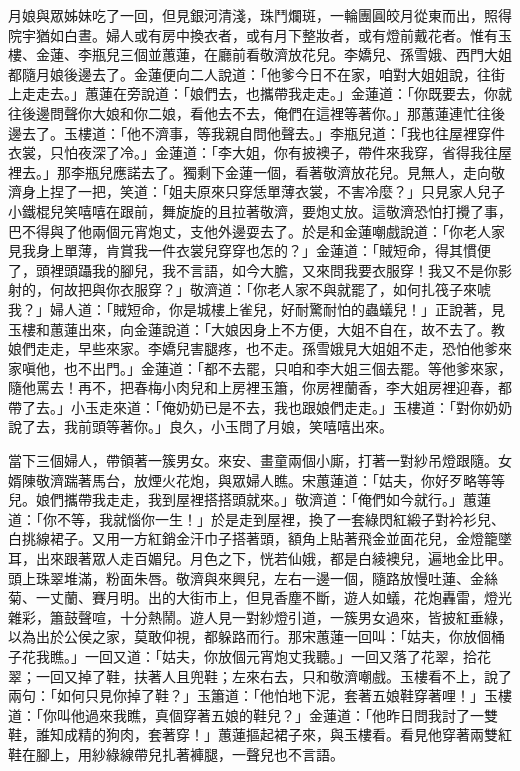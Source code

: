 月娘與眾姊妹吃了一回，但見銀河清淺，珠鬥爛斑，一輪團圓皎月從東而出，照得院宇猶如白晝。婦人或有房中換衣者，或有月下整妝者，或有燈前戴花者。惟有玉樓、金蓮、李瓶兒三個並蕙蓮，在廳前看敬濟放花兒。李嬌兒、孫雪娥、西門大姐都隨月娘後邊去了。金蓮便向二人說道：「他爹今日不在家，咱對大姐姐說，往街上走走去。」蕙蓮在旁說道：「娘們去，也攜帶我走走。」金蓮道：「你既要去，你就往後邊問聲你大娘和你二娘，看他去不去，俺們在這裡等著你。」那蕙蓮連忙往後邊去了。玉樓道：「他不濟事，等我親自問他聲去。」李瓶兒道：「我也往屋裡穿件衣裳，只怕夜深了冷。」金蓮道：「李大姐，你有披襖子，帶件來我穿，省得我往屋裡去。」那李瓶兒應諾去了。獨剩下金蓮一個，看著敬濟放花兒。見無人，走向敬濟身上捏了一把，笑道：「姐夫原來只穿恁單薄衣裳，不害冷麼？」只見家人兒子小鐵棍兒笑嘻嘻在跟前，舞旋旋的且拉著敬濟，要炮丈放。這敬濟恐怕打攪了事，巴不得與了他兩個元宵炮丈，支他外邊耍去了。於是和金蓮嘲戲說道：「你老人家見我身上單薄，肯賞我一件衣裳兒穿穿也怎的？」金蓮道：「賊短命，得其慣便了，頭裡頭躡我的腳兒，我不言語，如今大膽，又來問我要衣服穿！我又不是你影射的，何故把與你衣服穿？」敬濟道：「你老人家不與就罷了，如何扎筏子來唬我？」婦人道：「賊短命，你是城樓上雀兒，好耐驚耐怕的蟲蟻兒！」正說著，見玉樓和蕙蓮出來，向金蓮說道：「大娘因身上不方便，大姐不自在，故不去了。教娘們走走，早些來家。李嬌兒害腿疼，也不走。孫雪娥見大姐姐不走，恐怕他爹來家嗔他，也不出門。」金蓮道：「都不去罷，只咱和李大姐三個去罷。等他爹來家，隨他罵去！再不，把春梅小肉兒和上房裡玉簫，你房裡蘭香，李大姐房裡迎春，都帶了去。」小玉走來道：「俺奶奶已是不去，我也跟娘們走走。」玉樓道：「對你奶奶說了去，我前頭等著你。」良久，小玉問了月娘，笑嘻嘻出來。

當下三個婦人，帶領著一簇男女。來安、畫童兩個小廝，打著一對紗吊燈跟隨。女婿陳敬濟踹著馬台，放煙火花炮，與眾婦人瞧。宋蕙蓮道：「姑夫，你好歹略等等兒。娘們攜帶我走走，我到屋裡搭搭頭就來。」敬濟道：「俺們如今就行。」蕙蓮道：「你不等，我就惱你一生！」於是走到屋裡，換了一套綠閃紅緞子對衿衫兒、白挑線裙子。又用一方紅銷金汗巾子搭著頭，額角上貼著飛金並面花兒，金燈籠墜耳，出來跟著眾人走百媚兒。月色之下，恍若仙娥，都是白綾襖兒，遍地金比甲。頭上珠翠堆滿，粉面朱唇。敬濟與來興兒，左右一邊一個，隨路放慢吐蓮、金絲菊、一丈蘭、賽月明。出的大街市上，但見香塵不斷，遊人如蟻，花炮轟雷，燈光雜彩，簫鼓聲喧，十分熱鬧。遊人見一對紗燈引道，一簇男女過來，皆披紅垂綠，以為出於公侯之家，莫敢仰視，都躲路而行。那宋蕙蓮一回叫：「姑夫，你放個桶子花我瞧。」一回又道：「姑夫，你放個元宵炮丈我聽。」一回又落了花翠，拾花翠；一回又掉了鞋，扶著人且兜鞋；左來右去，只和敬濟嘲戲。玉樓看不上，說了兩句：「如何只見你掉了鞋？」玉簫道：「他怕地下泥，套著五娘鞋穿著哩！」玉樓道：「你叫他過來我瞧，真個穿著五娘的鞋兒？」金蓮道：「他昨日問我討了一雙鞋，誰知成精的狗肉，套著穿！」蕙蓮摳起裙子來，與玉樓看。看見他穿著兩雙紅鞋在腳上，用紗綠線帶兒扎著褲腿，一聲兒也不言語。

